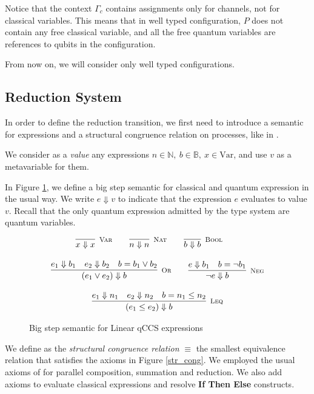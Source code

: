 Notice that the context $\Gamma_c$ contains assignments only for channels, not for classical variables. This means that in well typed configuration, $P$ does not contain any free classical variable, and all the free quantum variables are references to qubits in the configuration.

From now on, we will consider only well typed configurations.

\subsection{Reduction System}
In order to define the reduction transition, we first need to introduce a semantic for expressions and a structural congruence relation on processes, like in \cite{gayCommunicatingQuantumProcesses2005}.

We consider as a \textit{value} any expressions $n \in \mathbb{N},\  b \in \mathbb{B},\  x \in  \text{Var}$, and use $v$ as a metavariable for them.

In Figure \ref{big_step_exp}, we define a big step semantic for classical and quantum expression in the usual way. We write $e \Downarrow v$ to indicate that the expression $e$ evaluates to value $v$. Recall that the only quantum expression admitted by the type system are quantum variables.

\begin{figure}[h!]
\begin{gather*}
\infer[\mbox{\footnotesize\scshape Var}]{x \Downarrow x}{} \qquad
    \infer[\mbox{\footnotesize\scshape Nat}]{n \Downarrow n}{} \qquad
    \infer[\mbox{\footnotesize\scshape Bool}]{b \Downarrow b}{}  \qquad
\\[0.3cm]
    \infer[\mbox{\footnotesize\scshape Or}]{(e_1 \lor e_2) \Downarrow b}{e_1 \Downarrow b_1 & e_2 \Downarrow b_2 & b = b_1 \lor b_2} \qquad
    \infer[\mbox{\footnotesize\scshape Neg}]{\neg e \Downarrow b}{e \Downarrow b_1 & b = \neg b_1} \\[0.3cm]
    \infer[\mbox{\footnotesize\scshape Leq}]{(e_1 \leq e_2) \Downarrow b}{e_1 \Downarrow n_1 & e_2 \Downarrow n_2 & b = n_1 \leq n_2}
\end{gather*}
\caption{Big step semantic for Linear qCCS expressions}
\label{big_step_exp}
\end{figure}

We define as the \textit{structural congruence relation} $\equiv$ the smallest equivalence relation that satisfies the axioms in Figure \ref{str_cong}. We employed the usual axioms of \cite{milnerFunctionsProcesses1990} for parallel composition, summation and reduction. We also add axioms to evaluate classical expressions and resolve \textbf{If Then Else} constructs.

